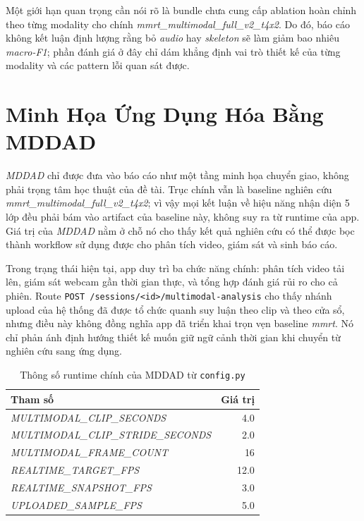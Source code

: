 \documentclass[conference,a4paper]{IEEEtran}
\begin{document}
Một giới hạn quan trọng cần nói rõ là bundle chưa cung cấp ablation hoàn chỉnh theo từng modality cho chính \textit{mmrt\_multimodal\_full\_v2\_t4x2}. Do đó, báo cáo không kết luận định lượng rằng bỏ \textit{audio} hay \textit{skeleton} sẽ làm giảm bao nhiêu \textit{macro-F1}; phần đánh giá ở đây chỉ dám khẳng định vai trò thiết kế của từng modality và các pattern lỗi quan sát được.

\section[Tang Ung Dung Hoa MDDAD]{Minh Họa Ứng Dụng Hóa Bằng MDDAD}
\textit{MDDAD} chỉ được đưa vào báo cáo như một tầng minh họa chuyển giao, không phải trọng tâm học thuật của đề tài. Trục chính vẫn là baseline nghiên cứu \textit{mmrt\_multimodal\_full\_v2\_t4x2}; vì vậy mọi kết luận về hiệu năng nhận diện 5 lớp đều phải bám vào artifact của baseline này, không suy ra từ runtime của app. Giá trị của \textit{MDDAD} nằm ở chỗ nó cho thấy kết quả nghiên cứu có thể được bọc thành workflow sử dụng được cho phân tích video, giám sát và sinh báo cáo.

Trong trạng thái hiện tại, app duy trì ba chức năng chính: phân tích video tải lên, giám sát webcam gần thời gian thực, và tổng hợp đánh giá rủi ro cho cả phiên. Route \texttt{POST /sessions/<id>/multimodal-analysis} cho thấy nhánh upload của hệ thống đã được tổ chức quanh suy luận theo clip và theo cửa sổ, nhưng điều này không đồng nghĩa app đã triển khai trọn vẹn baseline \textit{mmrt}. Nó chỉ phản ánh định hướng thiết kế muốn giữ ngữ cảnh thời gian khi chuyển từ nghiên cứu sang ứng dụng.

\begin{table}[t]
\caption{Thông số runtime chính của MDDAD từ \texttt{config.py}}
\label{tab:runtime-config}
\centering
\small
\begin{tabular}{lr}
\toprule
Tham số & Giá trị \\
\midrule
\textit{MULTIMODAL\_CLIP\_SECONDS} & 4.0 \\
\textit{MULTIMODAL\_CLIP\_STRIDE\_SECONDS} & 2.0 \\
\textit{MULTIMODAL\_FRAME\_COUNT} & 16 \\
\textit{REALTIME\_TARGET\_FPS} & 12.0 \\
\textit{REALTIME\_SNAPSHOT\_FPS} & 3.0 \\
\textit{UPLOADED\_SAMPLE\_FPS} & 5.0 \\
\bottomrule
\end{tabular}
\end{table}
\end{document}
